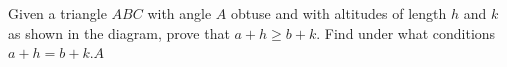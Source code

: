Given a triangle $ABC$ with angle $A$ obtuse and with altitudes of length $h$ and $k$ as shown in the diagram, prove that $a+h\ge b+k$. Find under what conditions $a+h=b+k$.$A$